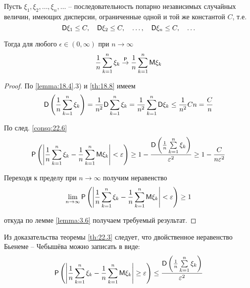 \begin{theorem}
\label{th:22.3}
Пусть $\xi_1 , \xi_2 , \ldots , \xi_n , \ldots$ -- последовательность попарно независимых случайных величин, имеющих дисперсии, ограниченные одной и той же константой $C$, т.е.
$$
\mathsf{D}\xi_1 \leq C,\quad
\mathsf{D}\xi_2 \leq C,\quad
\ldots,\quad
\mathsf{D}\xi_n \leq C,\quad
\ldots
$$


Тогда для любого $\epsilon \in (0, \infty)$ при $n \to \infty$
$$
	\frac{1}{n}\sum\limits_{k=1}^n \xi_k
	\stackrel{\mathsf{P}}{\to}
	\frac{1}{n}\sum\limits_{k=1}^n \mathsf{M}\xi_k
$$
\end{theorem}

\begin{proof}
По \ref{lemma:18.4}.3) и \ref{th:18.8} имеем	
$$
	\mathsf{D}\left(
		\frac{1}{n}\sum\limits_{k=1}^n \xi_k
	\right)=
	\frac{1}{n^2}\mathsf{D}\sum\limits_{k=1}^n \xi_k=
	\frac{1}{n^2}\sum\limits_{k=1}^n \mathsf{D}\xi_k\leq
	\frac{1}{n^2}Cn=\frac{C}{n}
$$

По след. \ref{consq:22.6}
$$
	\mathsf{P}\left(\left|
		\frac{1}{n}\sum\limits_{k=1}^n \xi_k-
		\frac{1}{n}\sum\limits_{k=1}^n \mathsf{M}\xi_k
	\right|<\varepsilon\right)
	\geq
	1-\frac{\mathsf{D}\left(\frac{1}{n}\sum\limits_{k=1}^n \xi_k\right)}{\varepsilon^2}\geq 1-\frac{C}{n\varepsilon^2}
$$

Переходя к пределу при $n \to \infty$ получим неравенство
$$
	\lim\limits_{n\to\infty}
	\mathsf{P}\left(\left|
		\frac{1}{n}\sum\limits_{k=1}^n \xi_k-
		\frac{1}{n}\sum\limits_{k=1}^n \mathsf{M}\xi_k
	\right|<\varepsilon\right)\geq 1
$$

откуда по лемме \ref{lemma:3.6} получаем требуемый результат.
\end{proof}

\begin{zam}
\label{zam:22.4}
Из доказательства теоремы \ref{th:22.3} следует, что двойственное неравенство Бьенеме – Чебышёва можно записать в виде:
\begin{equation}
	\label{bch}
	\mathsf{P}\left(\left|
		\frac{1}{n}\sum\limits_{k=1}^n \xi_k-
		\frac{1}{n}\sum\limits_{k=1}^n \mathsf{M}\xi_k
	\right|\geq\varepsilon\right)\leq \frac{\mathsf{D}\left(\frac{1}{n}\sum\limits_{k=1}^n \xi_k\right)}{\varepsilon^2}
\end{equation}
\end{zam}

